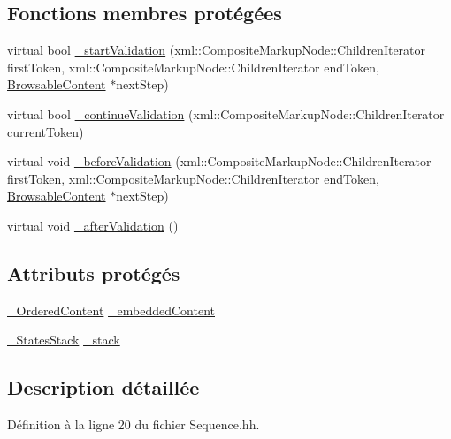 \subsection*{Fonctions membres protégées}
\begin{DoxyCompactItemize}
\item 
virtual bool \hyperlink{classdtd_1_1_sequence_a2765bc73d7fa4b92fafd60611e56e0f3}{\_\-startValidation} (xml::CompositeMarkupNode::ChildrenIterator firstToken, xml::CompositeMarkupNode::ChildrenIterator endToken, \hyperlink{classdtd_1_1_browsable_content}{BrowsableContent} $\ast$nextStep)
\item 
virtual bool \hyperlink{classdtd_1_1_sequence_a02874d51ebf3777a7fd16ee0e70b523b}{\_\-continueValidation} (xml::CompositeMarkupNode::ChildrenIterator currentToken)
\item 
virtual void \hyperlink{classdtd_1_1_sequence_a249219a1b47cc8298277491fe8356434}{\_\-beforeValidation} (xml::CompositeMarkupNode::ChildrenIterator firstToken, xml::CompositeMarkupNode::ChildrenIterator endToken, \hyperlink{classdtd_1_1_browsable_content}{BrowsableContent} $\ast$nextStep)
\item 
virtual void \hyperlink{classdtd_1_1_sequence_a9ab781006b7163a87e9b6d7e46314727}{\_\-afterValidation} ()
\end{DoxyCompactItemize}
\subsection*{Attributs protégés}
\begin{DoxyCompactItemize}
\item 
\hyperlink{classdtd_1_1_sequence_ae8f07ee87cfe7be8dd9eb5bf01959d66}{\_\-OrderedContent} \hyperlink{classdtd_1_1_sequence_a36b690d5fe1490780c079cb65f9821f6}{\_\-embeddedContent}
\item 
\hyperlink{classdtd_1_1_sequence_a779e1658dfabe1973ec9a2524501bc88}{\_\-StatesStack} \hyperlink{classdtd_1_1_sequence_aa0d3d57604b1b62caeb0eb2c7b776169}{\_\-stack}
\end{DoxyCompactItemize}


\subsection{Description détaillée}


Définition à la ligne 20 du fichier Sequence.hh.



